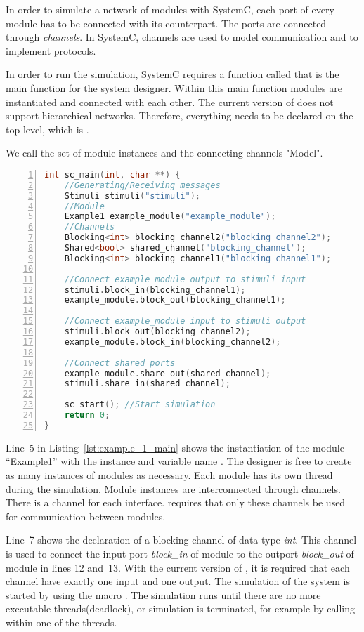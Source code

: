 In order to simulate a network of modules with SystemC, each port of
every module has to be connected with its counterpart. %
The ports are connected through \textit{channels}. %
In SystemC, channels are used to model communication and to implement
protocols. %


In order to run the simulation, SystemC requires a function called
 that is the main function for the system designer. %
Within this main function modules are instantiated and connected with
each other. %
The current version of \DeSCAM{} does not support hierarchical networks. %
Therefore, everything needs to be declared on the top level, which is  . %

We call the set of module instances and the connecting
channels "Model". %

\begin{lstlisting}[language=C++,
caption={Example1 sc\_main},
label={lst:example_1_main},
numbers=left,
captionpos=b,   
basicstyle={\footnotesize},
xleftmargin=5.0ex]
int sc_main(int, char **) {
    //Generating/Receiving messages
    Stimuli stimuli("stimuli");
    //Module
    Example1 example_module("example_module");
    //Channels
    Blocking<int> blocking_channel2("blocking_channel2");
    Shared<bool> shared_channel("blocking_channel");
    Blocking<int> blocking_channel1("blocking_channel1");

    //Connect example_module output to stimuli input
    stimuli.block_in(blocking_channel1);
    example_module.block_out(blocking_channel1);

    //Connect example_module input to stimuli output
    stimuli.block_out(blocking_channel2);
    example_module.block_in(blocking_channel2);

    //Connect shared ports
    example_module.share_out(shared_channel);
    stimuli.share_in(shared_channel);

    sc_start(); //Start simulation
    return 0;
}
\end{lstlisting}

Line~5 in Listing~\ref{lst:example_1_main} shows the instantiation of
the module ``Example1'' with the instance and variable name
. %
The designer is free to create as many instances of modules as
necessary. %
Each module has its own thread during the simulation. %
Module instances are interconnected through channels.  %
There is a channel for each interface. %
\DeSCAM{} requires that only these channels be used for communication between modules. %

Line~7 shows the declaration of a blocking channel of data type
\textit{int}. %
This channel is used to connect the input port \textit{block\_in} of
module  to the outport \textit{block\_out} of module
 in lines 12 and~13. %
 With the current version of \DeSCAM{}, it is required that each channel have exactly one input and one
output. %
 The simulation of the system is started by using the macro . %
The simulation runs until there are no more executable threads(deadlock), or simulation is terminated, for example by calling  within one of the threads. %

